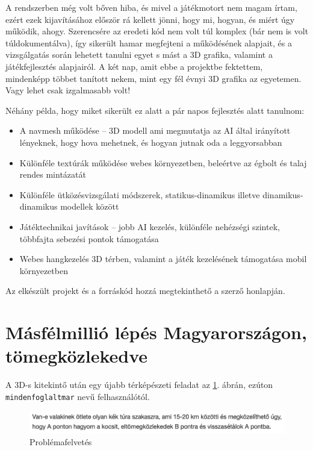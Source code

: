 \documentclass[a5paper,10pt]{article}
\begin{document}
\bigskip

A rendszerben még volt bőven hiba, és mivel a játékmotort nem magam írtam, ezért ezek kijavításához először rá kellett jönni, hogy mi, hogyan, és miért úgy működik, ahogy. Szerencsére az eredeti kód nem volt túl komplex (bár nem is volt túldokumentálva), így sikerült hamar megfejteni a működésének alapjait, és a vizsgálgatás során lehetett tanulni egyet s mást a 3D grafika, valamint a játékfejlesztés alapjairól. A két nap, amit ebbe a projektbe fektettem, mindenképp többet tanított nekem, mint egy fél évnyi 3D grafika az egyetemen. Vagy lehet csak izgalmasabb volt!

\bigskip

Néhány példa, hogy miket sikerült ez alatt a pár napos fejlesztés alatt tanulnom:

\begin{itemize}
    \item A navmesh működése -- 3D modell ami megmutatja az AI által irányított lényeknek, hogy hova mehetnek, és hogyan jutnak oda a leggyorsabban
    \item Különféle textúrák működése webes környezetben, beleértve az égbolt és talaj rendes mintázatát
    \item Különféle ütközésvizsgálati módszerek, statikus-dinamikus illetve dinamikus-dinamikus modellek között
    \item Játéktechnikai javítások -- jobb AI kezelés, különféle nehézségi szintek, többfajta sebezési pontok támogatása
    \item Webes hangkezelés 3D térben, valamint a játék kezelésének támogatása mobil környezetben
\end{itemize}

Az elkészült projekt és a forráskód hozzá megtekinthető a szerző honlapján\cite{canopyfps}.


\section{Másfélmillió lépés Magyarországon, tömegközlekedve}

A 3D-s kitekintő után egy újabb térképészeti feladat az \ref{mfm:question}. ábrán, ezúton \texttt{mindenfoglaltmar} nevű felhasználótól\cite{kekkorkereso:tumblr}.

\begin{figure}[!htbp]
    \centering
    \includegraphics[width=\textwidth]{images/kekkor_kerdes.png}
    \EndAccSupp{}%
    \caption{Problémafelvetés}
    \label{mfm:question}
\end{figure}
\end{document}
